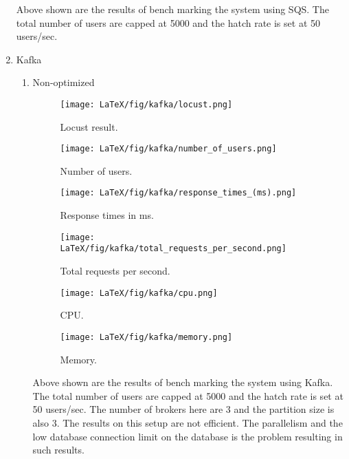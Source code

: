 \documentclass{IEEEtran}
\begin{document}
\begin{enumerate}
    Above shown are the results of bench marking the system using SQS. The total number of users are capped at 5000 and the hatch rate is set at 50 users/sec. \\
    \item Kafka \\
    \begin{enumerate}
        \item Non-optimized\\
        \begin{figure}[H]
        \texttt{[image: LaTeX/fig/kafka/locust.png]}
        \caption{Locust result.}
    \end{figure}
    \begin{figure}[H]
        \texttt{[image: LaTeX/fig/kafka/number\_of\_users.png]}
        \caption{Number of users.}
    \end{figure}
    \begin{figure}[H]
        \texttt{[image: LaTeX/fig/kafka/response\_times\_(ms).png]}
        \caption{Response times in ms.}
    \end{figure}
    \begin{figure}[H]
        \texttt{[image: LaTeX/fig/kafka/total\_requests\_per\_second.png]}
        \caption{Total requests per second.}
    \end{figure}
    \begin{figure}[H]
        \texttt{[image: LaTeX/fig/kafka/cpu.png]}
        \caption{CPU.}
    \end{figure}
    \begin{figure}[H]
        \texttt{[image: LaTeX/fig/kafka/memory.png]}
        \caption{Memory.}
    \end{figure}
        Above shown are the results of bench marking the system using Kafka. The total number of users are capped at 5000 and the hatch rate is set at 50 users/sec. The number of brokers here are 3 and the partition size is also 3. The results on this setup are not efficient. The parallelism and the low database connection limit on the database is the problem resulting in such results.  \\\\ 
        

\end{enumerate}
\end{enumerate}
\end{document}
